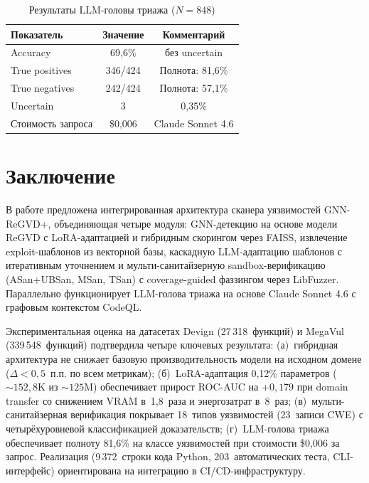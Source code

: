 \documentclass[runningheads]{llncs}
\begin{document}
\begin{table}
\centering
\caption{Результаты LLM-головы триажа ($N = 848$)}
\label{tab:llm_triage}
\small
\begin{tabular}{|l|c|c|}
\hline
\textbf{Показатель} & \textbf{Значение} & \textbf{Комментарий} \\
\hline
Accuracy & 69,6\% & без uncertain \\
True positives & 346/424 & Полнота: 81,6\% \\
True negatives & 242/424 & Полнота: 57,1\% \\
Uncertain & 3 & 0,35\% \\
Стоимость запроса & \$0,006 & Claude Sonnet 4.6 \\
\hline
\end{tabular}
\end{table}


\section{Заключение}

В работе предложена интегрированная архитектура сканера уязвимостей GNN-ReGVD+, объединяющая четыре модуля: GNN-детекцию на основе модели ReGVD с LoRA-адаптацией и гибридным скорингом через FAISS, извлечение exploit-шаблонов из векторной базы, каскадную LLM-адаптацию шаблонов с итеративным уточнением и мульти-санитайзерную sandbox-верификацию (ASan+UBSan, MSan, TSan) с coverage-guided фаззингом через LibFuzzer. Параллельно функционирует LLM-голова триажа на основе Claude Sonnet 4.6 с графовым контекстом CodeQL.

Экспериментальная оценка на датасетах Devign (27\,318~функций) и MegaVul (339\,548~функций) подтвердила четыре ключевых результата: (а)~гибридная архитектура не снижает базовую производительность модели на исходном домене ($\Delta < 0{,}5$~п.п. по всем метрикам); (б)~LoRA-адаптация 0,12\% параметров (${\sim}152{,}8$K из ${\sim}125$M) обеспечивает прирост ROC-AUC на $+0{,}179$ при domain transfer со снижением VRAM в~1,8~раза и энергозатрат в~8~раз; (в)~мульти-санитайзерная верификация покрывает 18~типов уязвимостей (23~записи CWE) с четырёхуровневой классификацией доказательств; (г)~LLM-голова триажа обеспечивает полноту 81,6\% на классе уязвимостей при стоимости \$0,006 за запрос. Реализация (9\,372~строки кода Python, 203~автоматических теста, CLI-интерфейс) ориентирована на интеграцию в CI/CD-инфраструктуру.
\end{document}
